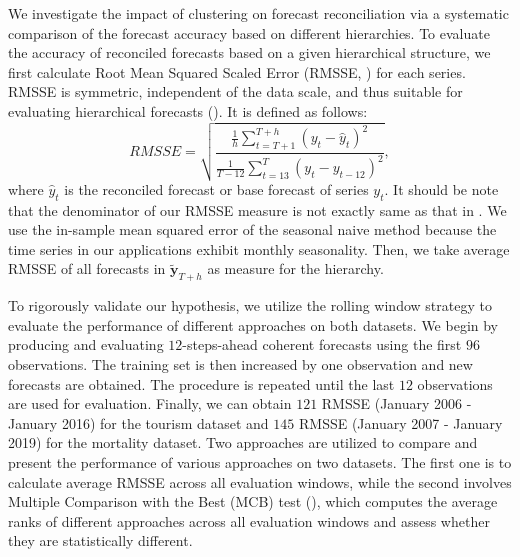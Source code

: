 \documentclass[a4paper,review,12pt,authoryear]{elsarticle}
\begin{document}
We investigate the impact of clustering on forecast reconciliation via a systematic comparison of the forecast accuracy based on different hierarchies. 
To evaluate the accuracy of reconciled forecasts based on a given hierarchical structure, we first calculate Root Mean Squared Scaled Error (RMSSE, \citealp{makridakisM5AccuracyCompetition2022}) for each series. 
RMSSE is symmetric, independent of the data scale, and thus suitable for evaluating hierarchical forecasts (\citealp{athanasopoulosEvaluationHierarchicalForecasts2023}). 
It is defined as follows:
\[
RMSSE = \sqrt{\frac{\frac{1}{h}\displaystyle\sum_{t=T+1}^{T+h}(y_t-\hat y_{t})^2}{\frac{1}{T-12}\displaystyle\sum_{t=13}^T (y_t - y_{t-12})^2}},
\]
where $\hat y_t$ is the reconciled forecast or base forecast of series $y_t$.
It should be note that the denominator of our RMSSE measure is not exactly same as that in \cite{makridakisM5AccuracyCompetition2022}. We use the in-sample mean squared error of the seasonal naive method because the time series in our applications exhibit monthly seasonality. 
Then, we take average RMSSE of all forecasts in $\tilde{\boldsymbol{y}}_{T+h}$ as measure for the hierarchy.

To rigorously validate our hypothesis, we utilize the rolling window strategy to evaluate the performance of different approaches on both datasets. We begin by producing and evaluating $12$-steps-ahead coherent forecasts using the first $96$ observations. The training set is then increased by one observation and new forecasts are obtained. The procedure is repeated until the last $12$ observations are used for evaluation. Finally, we can obtain $121$ RMSSE (January 2006 - January 2016) for the tourism dataset and $145$ RMSSE (January 2007 - January 2019) for the mortality dataset.  Two approaches are utilized to compare and present the performance of various approaches on two datasets. The first one is to calculate average RMSSE across all evaluation windows, while the second involves Multiple Comparison with the Best (MCB) test (\citealp{koningM3CompetitionStatistical2005}), which computes the average ranks of different approaches across all evaluation windows and assess whether they are statistically different. 
\end{document}
